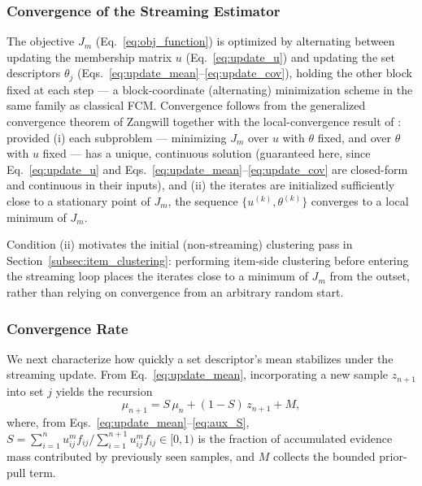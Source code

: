 \documentclass{article}
\begin{document}
\subsubsection{Convergence of the Streaming Estimator}

The objective $J_m$ (Eq.~\eqref{eq:obj_function}) is optimized by alternating between updating the membership matrix $u$ (Eq.~\eqref{eq:update_u}) and updating the set descriptors $\theta_j$ (Eqs.~\eqref{eq:update_mean}--\eqref{eq:update_cov}), holding the other block fixed at each step — a block-coordinate (alternating) minimization scheme in the same family as classical FCM. Convergence follows from the generalized convergence theorem of Zangwill together with the local-convergence result of \cite{hathaway1986local}: provided (i) each subproblem — minimizing $J_m$ over $u$ with $\theta$ fixed, and over $\theta$ with $u$ fixed — has a unique, continuous solution (guaranteed here, since Eq.~\eqref{eq:update_u} and Eqs.~\eqref{eq:update_mean}--\eqref{eq:update_cov} are closed-form and continuous in their inputs), and (ii) the iterates are initialized sufficiently close to a stationary point of $J_m$, the sequence $\{u^{(k)}, \theta^{(k)}\}$ converges to a local minimum of $J_m$.

Condition (ii) motivates the initial (non-streaming) clustering pass in Section~\ref{subsec:item_clustering}: performing item-side clustering before entering the streaming loop places the iterates close to a minimum of $J_m$ from the outset, rather than relying on convergence from an arbitrary random start.

\subsubsection{Convergence Rate}

We next characterize how quickly a set descriptor's mean stabilizes under the streaming update. From Eq.~\eqref{eq:update_mean}, incorporating a new sample $z_{n+1}$ into set $j$ yields the recursion
\begin{equation}
	\label{eq:mu_recursion}
	\mu_{n+1} = S \, \mu_n + (1-S) \, z_{n+1} + M,
\end{equation}
where, from Eqs.~\eqref{eq:update_mean}--\eqref{eq:aux_S}, $S = \sum_{i=1}^{n} u_{ij}^m f_{ij} \big/ \sum_{i=1}^{n+1} u_{ij}^m f_{ij} \in [0,1)$ is the fraction of accumulated evidence mass contributed by previously seen samples, and $M$ collects the bounded prior-pull term.
\end{document}
